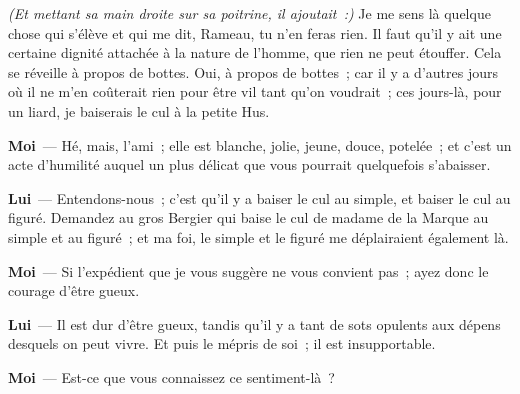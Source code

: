 \documentclass[french,twoside]{book} %
\newcommand{\labelchar}[1]{\textbf{\color{rubric} #1}}
\begin{document}
\emph{(Et mettant sa main droite sur sa poitrine, il ajoutait :)} Je me sens là quelque chose qui s’élève et qui me dit, Rameau, tu n’en feras rien. Il faut qu’il y ait une certaine dignité attachée à la nature de l’homme, que rien ne peut étouffer. Cela se réveille à propos de bottes. Oui, à propos de bottes ; car il y a d’autres jours où il ne m’en coûterait rien pour être vil tant qu’on voudrait ; ces jours-là, pour un liard, je baiserais le cul à la petite Hus.\par
\labelchar{Moi} — Hé, mais, l’ami ; elle est blanche, jolie, jeune, douce, potelée ; et c’est un acte d’humilité auquel un plus délicat que vous pourrait quelquefois s’abaisser.\par
\labelchar{Lui} — Entendons-nous ; c’est qu’il y a baiser le cul au simple, et baiser le cul au figuré. Demandez au gros Bergier qui baise le cul de madame de la Marque au simple et au figuré ; et ma foi, le simple et le figuré me déplairaient également là.\par
\labelchar{Moi} — Si l’expédient que je vous suggère ne vous convient pas ; ayez donc le courage d’être gueux.\par
\labelchar{Lui} — Il est dur d’être gueux, tandis qu’il y a tant de sots opulents aux dépens desquels on peut vivre. Et puis le mépris de soi ; il est insupportable.\par
\labelchar{Moi} — Est-ce que vous connaissez ce sentiment-là ?\par
\end{document}
